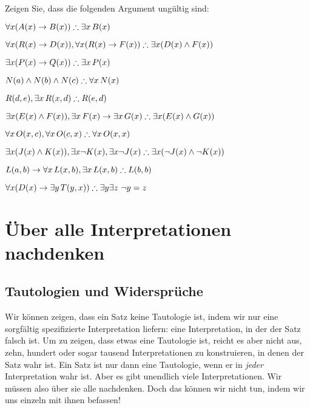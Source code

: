 \problempart
Zeigen Sie, dass die folgenden Argument ungültig sind:
\begin{earg}
\item $\forall x(\atom{A}{x} \eif \atom{B}{x}) \therefore \exists x\, \atom{B}{x}$
\item $\forall x(\atom{R}{x} \eif \atom{D}{x}), \forall x(\atom{R}{x} \eif \atom{F}{x}) \therefore \exists x(\atom{D}{x} \eand \atom{F}{x})$
\item $\exists x(\atom{P}{x}\eif \atom{Q}{x}) \therefore \exists x\, \atom{P}{x}$
\item $\atom{N}{a} \eand \atom{N}{b} \eand \atom{N}{c} \therefore \forall x\, \atom{N}{x}$
\item $\atom{R}{d,e}, \exists x\, \atom{R}{x,d} \therefore \atom{R}{e,d}$
\item $\exists x(\atom{E}{x} \eand \atom{F}{x}), \exists x\, \atom{F}{x} \eif \exists x\, \atom{G}{x} \therefore \exists x(\atom{E}{x} \eand \atom{G}{x})$
\item $\forall x\, \atom{O}{x,c}, \forall x\, \atom{O}{c,x} \therefore \forall x\, \atom{O}{x,x}$
\item $\exists x(\atom{J}{x} \eand \atom{K}{x}), \exists x \enot \atom{K}{x}, \exists x \enot \atom{J}{x} \therefore \exists x(\enot \atom{J}{x} \eand \enot \atom{K}{x})$
\item $\atom{L}{a,b} \eif \forall x\, \atom{L}{x,b}, \exists x\, \atom{L}{x,b} \therefore \atom{L}{b,b}$
\item $\forall x(\atom{D}{x} \eif \exists y\, \atom{T}{y,x}) \therefore \exists y \exists z\ \enot y= z$
\end{earg}

\chapter[Über alle Interpretationen nachdenken]{Über alle Interpretationen nachdenken}

\section{Tautologien und Widersprüche}
Wir können zeigen, dass ein Satz keine Tautologie ist, indem wir nur eine sorgfältig spezifizierte Interpretation liefern: eine Interpretation, in der der Satz falsch ist. Um zu zeigen, dass etwas eine Tautologie ist, reicht es aber nicht aus, zehn, hundert oder sogar tausend Interpretationen zu konstruieren, in denen der Satz wahr ist. Ein Satz ist nur dann eine Tautologie, wenn er in \emph{jeder} Interpretation wahr ist. Aber es gibt unendlich viele Interpretationen. Wir müssen also über sie alle nachdenken. Doch das können wir nicht tun, indem wir uns einzeln mit ihnen befassen!

